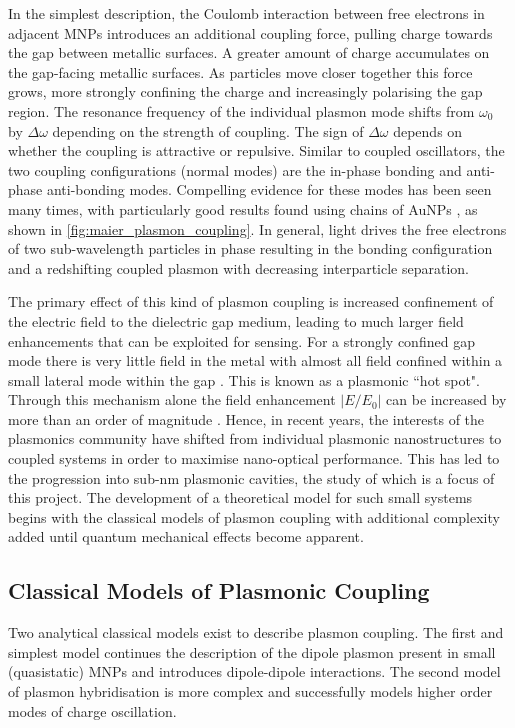 \documentclass{article}
\begin{document}
In the simplest description, the Coulomb interaction between free electrons in adjacent MNPs introduces an additional coupling force, pulling charge towards the gap between metallic surfaces. A greater amount of charge accumulates on the gap-facing metallic surfaces. As particles move closer together this force grows, more strongly confining the charge and increasingly polarising the gap region. The  resonance frequency of the individual plasmon mode shifts from $\omega_0$ by $\Delta\omega$ depending on the strength of coupling. The sign of $\Delta\omega$ depends on whether the coupling is attractive or repulsive. Similar to coupled oscillators, the two coupling configurations (normal modes) are the in-phase bonding and anti-phase anti-bonding modes. Compelling evidence for these modes has been seen many times, with particularly good results found using chains of AuNPs \cite{maier2002}, as shown in \autoref{fig:maier_plasmon_coupling}.
In general, light drives the free electrons of two sub-wavelength particles in phase resulting in the bonding configuration and a redshifting coupled plasmon with decreasing interparticle separation.

The primary effect of this kind of plasmon coupling is increased confinement of the electric field to the dielectric gap medium, leading to much larger field enhancements that can be exploited for sensing. For a strongly confined gap mode there is very little field in the metal with almost all field confined within a small lateral mode within the gap \cite{romero2006}. This is known as a plasmonic ``hot spot". Through this mechanism alone the field enhancement $\left|E/E_0\right|$ can be increased by more than an order of magnitude \cite{hao2004, talley2005}. Hence, in recent years, the interests of the plasmonics community have shifted from individual plasmonic nanostructures to coupled systems in order to maximise nano-optical performance. This has led to the progression into sub-nm plasmonic cavities, the study of which is a focus of this project. The development of a theoretical model for such small systems begins with the classical models of plasmon coupling with additional complexity added until quantum mechanical effects become apparent.

\subsection{Classical Models of Plasmonic Coupling}

Two analytical classical models exist to describe plasmon coupling. The first and simplest model continues the description of the dipole plasmon present in small (quasistatic) MNPs and introduces dipole-dipole interactions. The second model of plasmon hybridisation is more complex and successfully models higher order modes of charge oscillation.
\end{document}

